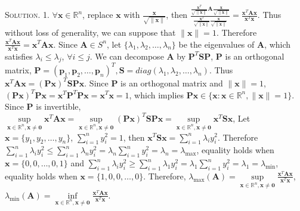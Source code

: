 \documentclass[12pt, a4paper, oneside]{ctexart}
\newenvironment{solution}{\par\noindent\textsc{Solution. }}{\\\par}
\begin{document}
\begin{solution}
	1. $\forall \mathbf{x} \in \mathbb{R}^{n}$, replace $\mathbf{x}$ with $\frac{\mathbf{x}}{\sqrt{\|\mathbf{x}\|}}$, then $\frac{\frac{\mathbf{x}^{T}}{\sqrt{\|\mathbf{x}\|}}\mathbf{A}\frac{\mathbf{x}}{\sqrt{\|\mathbf{x}\|}}}{\frac{\mathbf{x}^{T}}{\sqrt{\|\mathbf{x}\|}}\frac{\mathbf{x}}{\sqrt{\|\mathbf{x}\|}}} = \frac{\mathbf{x}^{T}\mathbf{A}\mathbf{x}}{\mathbf{x}^{T}\mathbf{x}}$. Thus without loss of generality, we can suppose that $\|\mathbf{x}\| = 1$. Therefore $\frac{\mathbf{x}^{T}\mathbf{A}\mathbf{x}}{\mathbf{x}^{T}\mathbf{x}} = \mathbf{x}^{T}\mathbf{A}\mathbf{x}$. Since $\mathbf{A}\in S^n$, let $\{\lambda_{1}, \lambda_{2}, \dots, \lambda_{n}\}$ be the eigenvalues of $\mathbf{A}$, which satisfies $\lambda_{i} \leq \lambda_{j}$, $\forall i \leq j$. We can decompose $\mathbf{A}$ by $\mathbf{P}^{T}\mathbf{S}\mathbf{P}$, $\mathbf{P}$ is an orthogonal matrix, $\mathbf{P} = (\mathbf{p}_{1}, \mathbf{p}_{2}, \dots, \mathbf{p}_{n})^{T}, \mathbf{S} = diag(\lambda_{1}, \lambda_{2}, \dots, \lambda_{n})$. Thus $\mathbf{x}^{T}\mathbf{A}\mathbf{x} = (\mathbf{Px})^{T}\mathbf{S}\mathbf{Px}$. Since $\mathbf{P}$ is an orthogonal matrix and $\|\mathbf{x}\| = 1$, $(\mathbf{Px})^{T}\mathbf{Px} = \mathbf{x}^{T}\mathbf{P}^{T}\mathbf{P}\mathbf{x} = \mathbf{x}^{T}\mathbf{x} = 1$, which implies $\mathbf{Px} \in \{\mathbf{x}: \mathbf{x}\in\mathbb{R}^n, \|\mathbf{x}\| = 1\}$. Since $\mathbf{P}$ is invertible, $\sup\limits_{\mathbf{x}\in\mathbb{R}^n, \mathbf{x}\not=\mathbf{0}}\mathbf{x}^{T}\mathbf{A}\mathbf{x} = \sup\limits_{\mathbf{x}\in\mathbb{R}^n, \mathbf{x}\not=\mathbf{0}}(\mathbf{Px})^{T}\mathbf{S}\mathbf{Px} = \sup\limits_{\mathbf{x}\in\mathbb{R}^n, \mathbf{x}\not=\mathbf{0}}\mathbf{x}^{T}\mathbf{S}\mathbf{x}$, Let $\mathbf{x} = \{y_{1}, y_{2}, \dots, y_{n}\}$, $\sum_{i = 1}^{n} y_{i}^{2} = 1$, then $\mathbf{x}^{T}\mathbf{S}\mathbf{x} = \sum_{i = 1}^{n} \lambda_{i}y_{i}^{2}$. Therefore $\sum_{i = 1}^{n} \lambda_{i} y_{i}^{2} \leq \sum_{i = 1}^{n} \lambda_{n} y_{i}^{2} = \lambda_{n} \sum_{i = 1}^{n} y_{i}^{2} = \lambda_{n} = \lambda_{\max}$, equality holds when $\mathbf{x} = \{0, 0, \dots, 0, 1\}$ and $\sum_{i = 1}^{n} \lambda_{i} y_{i}^{2} \geq \sum_{i = 1}^{n} \lambda_{1} y_{i}^{2} = \lambda_{1} \sum_{i = 1}^{n} y_{i}^{2} = \lambda_{1} = \lambda_{\min}$, equality holds when $\mathbf{x} = \{1, 0, 0, \dots, 0\}$. Therefore, $\lambda_{\max}(\mathbf{A})=\sup\limits_{\mathbf{x}\in\mathbb{R}^n, \mathbf{x}\not=\mathbf{0}} \frac{\mathbf{x}^{T}\mathbf{A}\mathbf{x}}{\mathbf{x}^{T}\mathbf{x}}$, $\lambda_{\min}(\mathbf{A})=\inf\limits_{\mathbf{x}\in\mathbb{R}^n, \mathbf{x}\not=\mathbf{0}} \frac{\mathbf{x}^{T}\mathbf{A}\mathbf{x}}{\mathbf{x}^{T}\mathbf{x}}$.
\end{solution}
\end{document}
